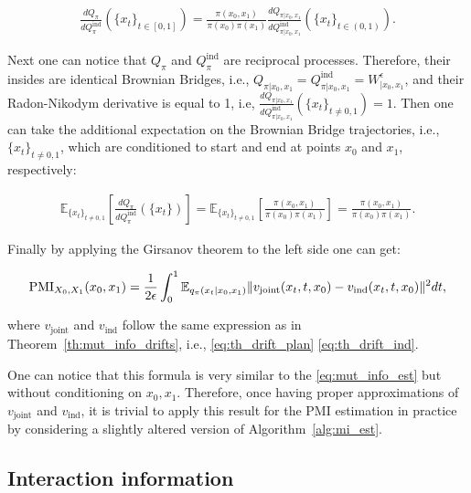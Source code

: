 \begin{gather}
    \frac{dQ_{\pi}}{dQ^\text{ind}_{\pi}}(\{x_t\}_{t\in[0, 1]}) = \frac{\pi(x_0, x_1)}{\pi(x_0)\pi(x_1)} \frac{dQ_{\pi|x_0, x_1}}{dQ^\text{ind}_{\pi|x_0, x_1}}(\{x_t\}_{t\in(0, 1)}). \nonumber
\end{gather}

Next one can notice that $Q_{\pi}$ and $Q^\text{ind}_{\pi}$ are reciprocal processes. Therefore, their insides are identical Brownian Bridges, i.e.,  $Q_{\pi|x_0, x_1} = Q^\text{ind}_{\pi|x_0, x_1} = W^\epsilon_{|x_0,x_1}$, and their Radon-Nikodym derivative is equal to 1, i.e,  $\frac{dQ_{\pi|x_0, x_1}}{dQ^\text{ind}_{\pi|x_0, x_1}}(\{x_t\}_{t\neq0, 1})=1$. Then one can take the additional expectation on the Brownian Bridge trajectories, i.e., $\{x_t\}_{t\neq0, 1}$, which are conditioned to start and end at points $x_0$ and $x_1$, respectively:

\begin{gather}
    \mathbb{E}_{\{x_t\}_{t\neq0, 1}}\left[\frac{dQ_{\pi}}{dQ^\text{ind}_{\pi}}(\{x_t\}) \right]= \mathbb{E}_{\{x_t\}_{t\neq0, 1}}\left[\frac{\pi(x_0, x_1)}{\pi(x_0)\pi(x_1)} \right] = \frac{\pi(x_0, x_1)}{\pi(x_0)\pi(x_1)}. \nonumber
\end{gather}

Finally by applying the Girsanov theorem \cite{oksendal2003stochastic} to the left side one can get:

\begin{gather}
    \operatorname{\mathrm{PMI}}_{X_0, X_1}(x_0, x_1) = \frac{1}{2\epsilon} \int_{0}^{1} \mathbb{E}_{q_{\pi}(x_t|x_0, x_1)} \Vert v_{\text{joint}}(x_t, t, x_0) - v_{\text{ind}}(x_t, t, x_0) \Vert^2 dt,
\end{gather}

where $v_{\text{joint}}$ and $v_{\text{ind}}$ follow the same expression as in Theorem~\ref{th:mut_info_drifts}, i.e., \eqref{eq:th_drift_plan} \eqref{eq:th_drift_ind}.

One can notice that this formula is very similar to the \eqref{eq:mut_info_est} but without conditioning on $x_0, x_1$. Therefore, once having proper approximations of $v_{\text{joint}}$ and $v_{\text{ind}}$, it is trivial to apply this result for the PMI estimation in practice by considering a slightly altered version of Algorithm~\ref{alg:mi_est}.


\subsection{Interaction information} \label{appx:interacion_info}


